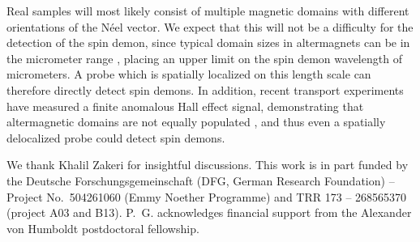\documentclass[aps,prl,reprint,twocolumns,superscriptaddress]{revtex4-2}
\providecommand{\DIFaddbegin}{} %
\providecommand{\DIFaddend}{} %
\providecommand{\DIFdelbegin}{} %
\providecommand{\DIFdelend}{} %
\begin{document}
	Real samples will most likely consist of multiple magnetic domains with different orientations of the N\'eel vector. We expect that this will not be a difficulty for the detection of the spin demon, since typical domain sizes in altermagnets can be in the micrometer range \cite{aminNanoscaleImagingControl2024a}, placing an upper limit on the spin demon wavelength of micrometers. A probe which is spatially localized on this length scale can therefore directly detect spin demons. In addition, recent transport experiments have measured a finite anomalous Hall effect signal, demonstrating that altermagnetic domains are not equally populated \cite{jeongMetallicityAnomalousHall2025a,leiviskaAnisotropyAnomalousHall2024, reichlovaObservationSpontaneousAnomalous2024a}, and thus even a spatially delocalized probe could detect spin demons.
	\begin{acknowledgments}
		We thank Khalil Zakeri for insightful discussions. This work is in part funded by the Deutsche Forschungsgemeinschaft (DFG, German Research Foundation) -- Project No.~504261060 (Emmy Noether Programme) and TRR 173 -- 268565370 (project A03 and B13). P.~G. acknowledges financial support from the Alexander von Humboldt postdoctoral fellowship. 
	\end{acknowledgments}
	\DIFdelbegin %
\DIFdelend \DIFaddbegin 
 \DIFaddend
\end{document}
